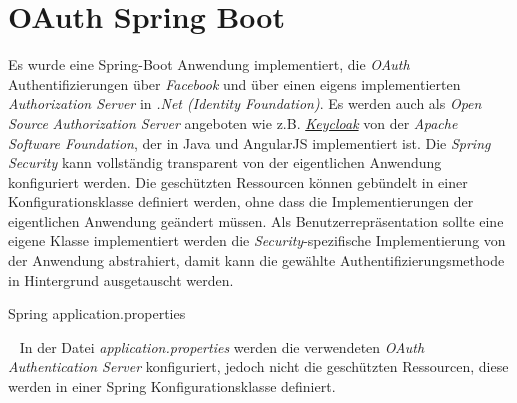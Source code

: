 \section{OAuth Spring Boot}
Es wurde eine Spring-Boot Anwendung implementiert, die \emph{OAuth} Authentifizierungen über \emph{Facebook} und über einen eigens implementierten \emph{Authorization Server} in \emph{.Net  (Identity Foundation)}. Es werden auch als \emph{Open Source} \emph{Authorization Server} angeboten wie z.B. \href{http://www.keycloak.org/}{\emph{Keycloak}} von der \emph{Apache Software Foundation}, der in Java und AngularJS implementiert ist. 
\newline
\newline
Die \emph{Spring Security} kann vollständig transparent von der eigentlichen Anwendung konfiguriert werden. Die geschützten Ressourcen können gebündelt in einer Konfigurationsklasse definiert werden, ohne dass die Implementierungen der eigentlichen Anwendung geändert müssen. Als Benutzerrepräsentation sollte eine eigene Klasse implementiert werden die \emph{Security}-spezifische Implementierung von der Anwendung abstrahiert, damit kann die gewählte Authentifizierungsmethode in Hintergrund ausgetauscht werden.

\begin{code}
	\caption{Spring application.properties}
	\label{source:epidemiology-logistic}
\end{code}
\ \newline
\newline
In der Datei \emph{application.properties} werden die verwendeten \emph{OAuth Authentication Server} konfiguriert, jedoch nicht die geschützten Ressourcen, diese werden in einer Spring Konfigurationsklasse definiert.
\newpage

